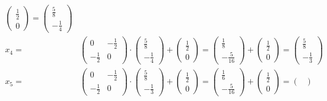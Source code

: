\documentclass[a4paper,10pt]{article}
\begin{document}
\begin{enumerate}[a)]
\begin{align*}
\begin{pmatrix}
			\frac{1}{2}\\
			0
			\end{pmatrix}
			=
			\begin{pmatrix}
			\frac{5}{8}\\[2pt]
			-\frac{1}{4}
			\end{pmatrix}\\
			x_4 = &
			\begin{pmatrix}
			0 & -\frac{1}{2}\\[2pt]
			-\frac{1}{2} & 0
			\end{pmatrix} 
			\cdot
			\begin{pmatrix}
			\frac{5}{8}\\[2pt]
			-\frac{1}{4}
			\end{pmatrix}
			+
			\begin{pmatrix}
			\frac{1}{2}\\
			0
			\end{pmatrix}
			=
			\begin{pmatrix}
			\frac{1}{8}\\[2pt]
			-\frac{5}{16}
			\end{pmatrix}
			+
			\begin{pmatrix}
			\frac{1}{2}\\
			0
			\end{pmatrix}
			=
			\begin{pmatrix}
			\frac{5}{8}\\[2pt]
			-\frac{1}{3}
			\end{pmatrix}\\
			x_5 = &
			\begin{pmatrix}
			0 & -\frac{1}{2}\\[2pt]
			-\frac{1}{2} & 0
			\end{pmatrix} 
			\cdot
			\begin{pmatrix}
			\frac{5}{8}\\[2pt]
			-\frac{1}{3}
			\end{pmatrix}
			+
			\begin{pmatrix}
			\frac{1}{2}\\
			0
			\end{pmatrix}
			=
			\begin{pmatrix}
			\frac{1}{6}\\[2pt]
			-\frac{5}{16}
			\end{pmatrix}
			+
			\begin{pmatrix}
			\frac{1}{2}\\
			0
			\end{pmatrix}
			=
			\begin{pmatrix}

\end{pmatrix}
\end{align*}
\end{enumerate}
\end{document}

